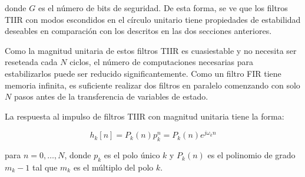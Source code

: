 \message{ !name(../main.tex)}\documentclass[journal,transmag]{IEEEtran}
\begin{document}
    donde $G$ es el número de bits de seguridad. De esta forma, se ve que los filtros TIIR con modos escondidos en el círculo unitario tiene propiedades de estabilidad deseables en comparación con los descritos en las dos secciones anteriores.

    Como la magnitud unitaria de estos filtros TIIR es cuasiestable y no necesita ser reseteada cada $N$ ciclos, el número de computaciones necesarias para estabilizarlos puede ser reducido significantemente. Como un filtro FIR tiene memoria infinita, es suficiente realizar dos filtros en paralelo comenzando con solo $N$ pasos antes de la transferencia de variables de estado.

    La respuesta al impulso de filtros TIIR con magnitud unitaria tiene la forma:

    \begin{equation}
      h_k[n] = P_k(n) p_k^n = P_k(n) e^{j\omega_k n}
    \end{equation}

    para $n=0,\ldots , N$, donde $p_k$ es el polo único $k$ y $P_k(n)$ es el polinomio de grado $m_k - 1$ tal que $m_k$ es el múltiplo del polo $k$.


\end{document}
